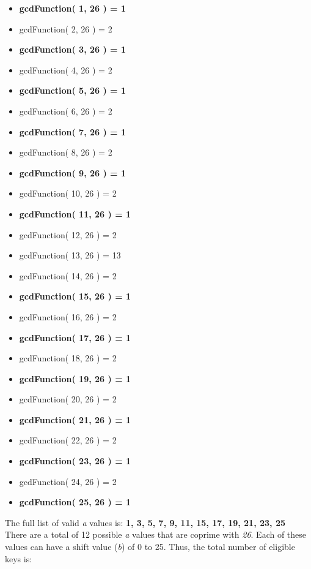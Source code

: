 \documentclass[]{article}
\begin{document}
\begin{multicols}{2}
	\begin{itemize}
		\item \textbf{gcdFunction( 1, 26 ) = 1}
		\item gcdFunction( 2, 26 ) = 2
		\item \textbf{gcdFunction( 3, 26 ) = 1}
		\item gcdFunction( 4, 26 ) = 2
		\item \textbf{gcdFunction( 5, 26 ) = 1}
		\item gcdFunction( 6, 26 ) = 2
		\item \textbf{gcdFunction( 7, 26 ) = 1}
		\item gcdFunction( 8, 26 ) = 2
	    \item \textbf{gcdFunction( 9, 26 ) = 1}
		\item gcdFunction( 10, 26 ) = 2
		\item \textbf{gcdFunction( 11, 26 ) = 1}
		\item gcdFunction( 12, 26 ) = 2
		\item gcdFunction( 13, 26 ) = 13
		\item gcdFunction( 14, 26 ) = 2
		\item \textbf{gcdFunction( 15, 26 ) = 1}
		\item gcdFunction( 16, 26 ) = 2
		\item \textbf{gcdFunction( 17, 26 ) = 1}
		\item gcdFunction( 18, 26 ) = 2
		\item \textbf{gcdFunction( 19, 26 ) = 1}
		\item gcdFunction( 20, 26 ) = 2
		\item \textbf{gcdFunction( 21, 26 ) = 1}
		\item gcdFunction( 22, 26 ) = 2	
		\item \textbf{gcdFunction( 23, 26 ) = 1}
		\item gcdFunction( 24, 26 ) = 2
		\item \textbf{gcdFunction( 25, 26 ) = 1}
	\end{itemize}
\end{multicols}


\vspace{0.5cm}

The full list of valid \textit{a} values is: \textbf{1, 3, 5, 7, 9, 11, 15, 17, 19, 21, 23, 25}\\

There are a total of 12 possible \textit{a} values that are coprime with \textit{26}. Each of these values can have a shift value (\textit{b}) of 0 to 25. Thus, the total number of eligible keys is:
\end{document}
